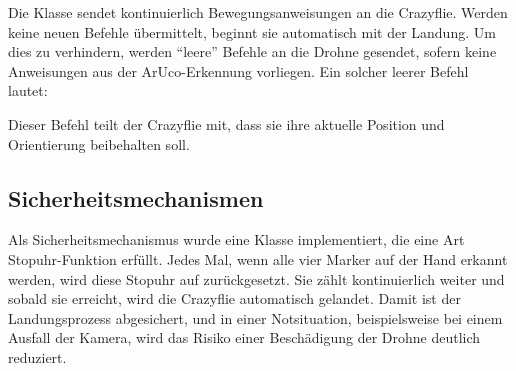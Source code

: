 Die Klasse  sendet kontinuierlich Bewegungsanweisungen an die Crazyflie.
Werden keine neuen Befehle übermittelt, beginnt sie automatisch mit der Landung.
Um dies zu verhindern, werden \enquote{leere} Befehle an die Drohne gesendet, sofern keine Anweisungen aus der ArUco-Erkennung vorliegen.
Ein solcher leerer Befehl lautet:
\begin{center}
\end{center}
Dieser Befehl teilt der Crazyflie mit, dass sie ihre aktuelle Position und Orientierung beibehalten soll.

\subsection{Sicherheitsmechanismen}
Als Sicherheitsmechanismus wurde eine Klasse implementiert, die eine Art Stopuhr-Funktion erfüllt.
Jedes Mal, wenn alle vier Marker auf der Hand erkannt werden, wird diese Stopuhr auf  zurückgesetzt.
Sie zählt kontinuierlich weiter und sobald sie  erreicht, wird die Crazyflie automatisch gelandet.
Damit ist der Landungsprozess abgesichert, und in einer Notsituation, beispielsweise bei einem Ausfall der Kamera, wird das Risiko einer Beschädigung der Drohne deutlich reduziert.


\endgroup